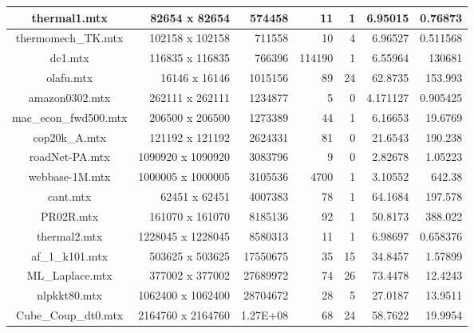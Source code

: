 \begin{table}[!htp]
\begin{adjustbox}{max width=\textwidth}
\begin{tabular}{cr|r|r|r|r|r|}
				\multicolumn{1}{|c|}{thermal1.mtx} & 82654 x 82654 & 574458 & 11 & 1 & 6.95015 & 0.76873 \\ \hline
				\multicolumn{1}{|c|}{thermomech\_TK.mtx} & 102158 x 102158 & 711558 & 10 & 4 & 6.96527 & 0.511568 \\ \hline
				\multicolumn{1}{|c|}{dc1.mtx} & 116835 x 116835 & 766396 & 114190 & 1 & 6.55964 & 130681 \\ \hline
				\multicolumn{1}{|c|}{olafu.mtx} & 16146 x 16146 & 1015156 & 89 & 24 & 62.8735 & 153.993 \\ \hline
				\multicolumn{1}{|c|}{amazon0302.mtx} & 262111 x 262111 & 1234877 & 5 & 0 & 4.171127 & 0.905425 \\ \hline
				\multicolumn{1}{|c|}{mac\_econ\_fwd500.mtx} & 206500 x 206500 & 1273389 & 44 & 1 & 6.16653 & 19.6769 \\ \hline
				\multicolumn{1}{|c|}{cop20k\_A.mtx} & 121192 x 121192 & 2624331 & 81 & 0 & 21.6543 & 190.238 \\ \hline
				\multicolumn{1}{|c|}{roadNet-PA.mtx} & 1090920 x 1090920 & 3083796 & 9 & 0 & 2.82678 & 1.05223 \\ \hline
				\multicolumn{1}{|c|}{webbase-1M.mtx} & 1000005 x 1000005 & 3105536 & 4700 & 1 & 3.10552 & 642.38 \\ \hline
				\multicolumn{1}{|c|}{cant.mtx} & 62451 x 62451 & 4007383 & 78 & 1 & 64.1684 & 197.578 \\ \hline
				\multicolumn{1}{|c|}{PR02R.mtx} & 161070 x 161070 & 8185136 & 92 & 1 & 50.8173 & 388.022 \\ \hline
				\multicolumn{1}{|c|}{thermal2.mtx} & 1228045 x 1228045 & 8580313 & 11 & 1 & 6.98697 & 0.658376 \\ \hline
				\multicolumn{1}{|c|}{af\_1\_k101.mtx} & 503625 x 503625 & 17550675 & 35 & 15 & 34.8457 & 1.57899 \\ \hline
				\multicolumn{1}{|c|}{ML\_Laplace.mtx} & 377002 x 377002 & 27689972 & 74 & 26 & 73.4478 & 12.4243 \\ \hline
				\multicolumn{1}{|c|}{nlpkkt80.mtx} & 1062400 x 1062400 & 28704672 & 28 & 5 & 27.0187 & 13.9511 \\ \hline
				\multicolumn{1}{|c|}{Cube\_Coup\_dt0.mtx} & 2164760 x 2164760 & 1.27E+08 & 68 & 24 & 58.7622 & 19.9954 \\ \hline
			\end{tabular}
		\end{adjustbox}
	\end{table}
